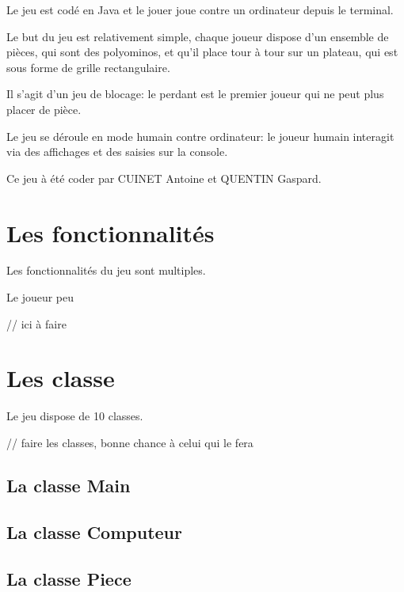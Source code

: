 \documentclass[a4paper, titlepage, french]{report}
\begin{document}
\bigskip

Le jeu est codé en Java et le jouer joue contre un ordinateur depuis le terminal.

\bigskip

Le but du jeu est relativement simple, chaque joueur dispose d'un ensemble de pièces, qui sont des polyominos, et qu'il place
tour à tour sur un plateau, qui est sous forme de grille rectangulaire. 

Il s'agit d'un jeu de blocage: le perdant est le premier
joueur qui ne peut plus placer de pièce.

Le jeu se déroule en mode
humain contre ordinateur: le joueur humain interagit via des affichages et des saisies sur la console.

\bigskip

Ce jeu à été coder par CUINET Antoine et QUENTIN Gaspard.



\newpage

\chapter{Les fonctionnalités}

Les fonctionnalités du jeu sont multiples.

Le joueur peu

\color{red}
// ici à faire
\color{black}

\chapter{Les classe}

Le jeu dispose de 10 classes.
\bigskip

\color{red}
// faire les classes, bonne chance à celui qui le fera
\color{black}

\section{La classe Main}
\bigskip

\section{La classe Computeur}
\bigskip

\section{La classe Piece}
\bigskip
\end{document}

